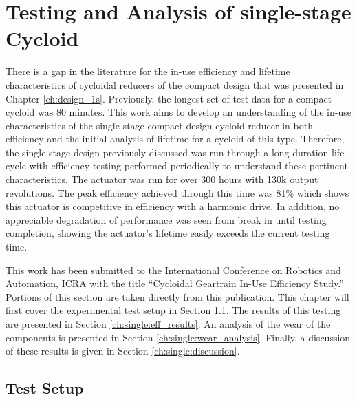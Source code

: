 
\chapter{Testing and Analysis of single-stage Cycloid}\label{ch:single}

There is a gap in the literature for the in-use efficiency and lifetime characteristics of cycloidal reducers of the compact design that was presented in Chapter \ref{ch:design_1s}. Previously, the longest set of test data for a compact cycloid was 80 minutes. This work aims to develop an understanding of the in-use characteristics of the single-stage compact design cycloid reducer in both efficiency and the initial analysis of lifetime for a cycloid of this type. Therefore, the single-stage design previously discussed was run through a long duration life-cycle with efficiency testing performed periodically to understand these pertinent characteristics. The actuator was run for over 300 hours with 130k output revolutions. The peak efficiency achieved through this time was 81\% which shows this actuator is competitive in efficiency with a harmonic drive. In addition, no appreciable degradation of performance was seen from break in until testing completion, showing the actuator's lifetime easily exceeds the current testing time.  

This work has been submitted to the International Conference on Robotics and Automation, ICRA with the title ``Cycloidal Geartrain In-Use Efficiency Study.'' Portions of this section are taken directly from this publication. This chapter will first cover the experimental test setup in Section \ref{ch:single:test_setup}. The results of this testing are presented in Section \ref{ch:single:eff_results}. An analysis of the wear of the components is presented in Section \ref{ch:single:wear_analysis}. Finally, a discussion of these results is given in Section \ref{ch:single:discussion}.

\section{Test Setup} \label{ch:single:test_setup}

